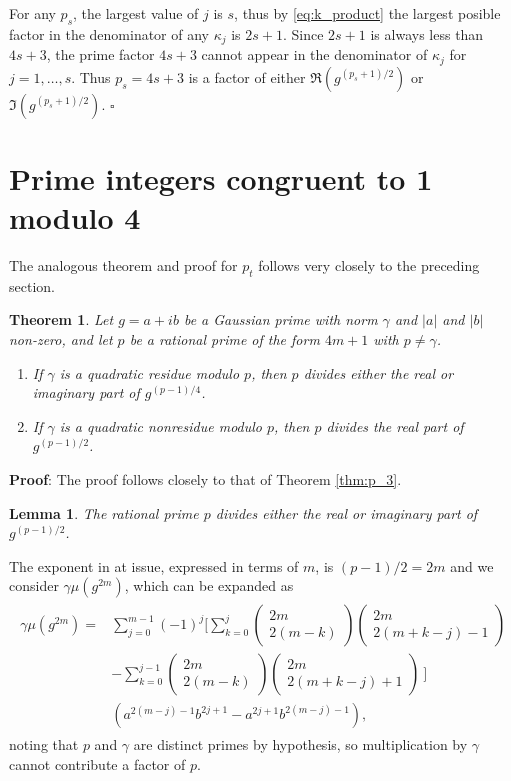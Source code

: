 \documentclass[oneside,english,man]{amsart}
\numberwithin{equation}{section}
\numberwithin{figure}{section}
\newtheorem{theorem}{Theorem}
\newtheorem{lemma}{Lemma}[theorem]
\begin{document}
For any $p_s$, the largest value of $j$ is $s$, thus by \eqref{eq:k_product} the largest posible factor in the denominator of any $\kappa_j$ is $2s+1$.  Since $2s+1$ is always less than $4s+3$, the prime factor $4s+3$ cannot appear in the denominator of $\kappa_j$ for $j=1,\ldots,s$.  Thus $p_s=4s+3$ is a factor of either $\Re\left(g^{(p_s+1)/2}\right)$ or $\Im\left(g^{(p_s+1)/2}\right)$. $\square$

\section{Prime integers congruent to 1 modulo 4}
The analogous theorem and proof for $p_t$ follows very closely to the preceding section.
\\
\begin{theorem} \label{thm:p_1}
	Let $g=a+ib$ be a Gaussian prime with norm $\gamma$ and $\vert a\vert$ and $\vert b\vert$ non-zero, and let $p$ be a rational prime of the form $4m+1$ with $p\neq \gamma$.
	\begin{enumerate}[label={(\roman*)}]
		\item If $\gamma$ is a quadratic residue modulo $p$, then $p$ divides either the real or imaginary part of $g^{(p-1)/4}$. \label{thm:p_1_residue}
		\item If $\gamma$ is a quadratic nonresidue modulo $p$, then $p$ divides the real part of $g^{(p-1)/2}$. \label{thm:p_1_nonresidue}
	\end{enumerate}
\end{theorem}
\textbf{Proof}:  The proof follows closely to that of Theorem \ref{thm:p_3}.
\begin{lemma}
	The rational prime $p$ divides either the real or imaginary part of $g^{(p-1)/2}$. 
\end{lemma}

The exponent in at issue, expressed in terms of $m$, is $(p-1)/2=2m$ and we consider $\gamma\mu(g^{2m})$, which can be expanded as
\begin{align} \label{eq:ng_mu_expand}
	\begin{split}
		\gamma\mu(g^{2m}) =& \sum_{j=0}^{m-1} (-1)^j \Bigg[ \sum_{k=0}^j \begin{pmatrix} 2m\\2(m-k) \end{pmatrix} \begin{pmatrix} 2m\\2(m+k-j)-1 \end{pmatrix} \\
		&  -\sum_{k=0}^{j-1} \begin{pmatrix} 2m\\2(m-k) \end{pmatrix} \begin{pmatrix} 2m\\2(m+k-j)+1 \end{pmatrix}\ \Bigg] \\
		& \left( a^{2(m-j)-1}b^{2j+1} - a^{2j+1}b^{2(m-j)-1} \right),
	\end{split}
\end{align}
noting that $p$ and $\gamma$ are distinct primes by hypothesis, so multiplication by $\gamma$ cannot contribute a factor of $p$.
\\
\end{document}
